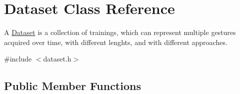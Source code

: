 \hypertarget{class_dataset}{\section{\-Dataset \-Class \-Reference}
\label{class_dataset}
}


\-A \hyperlink{class_dataset}{\-Dataset} is a collection of trainings, which can represent multiple gestures acquired over time, with different lenghts, and with different approaches.  




{\ttfamily \#include $<$dataset.\-h$>$}

\subsection*{\-Public \-Member \-Functions}
